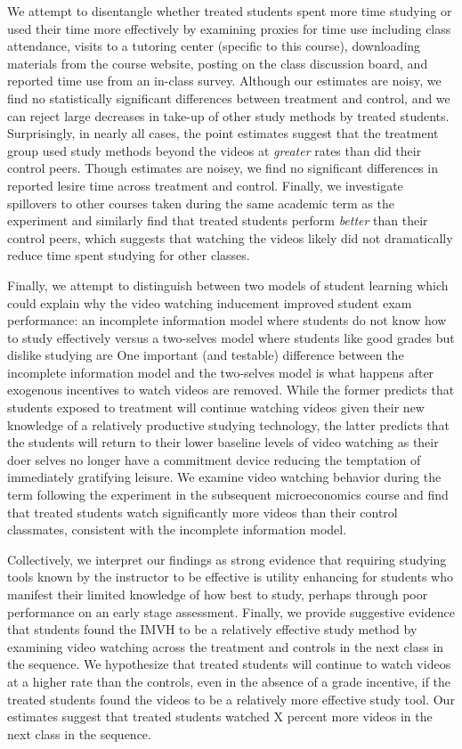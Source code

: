 \documentclass[12pt]{article}
\begin{document}
We attempt to disentangle whether treated students spent more time studying or used their time more effectively by examining proxies for time use including class attendance, visits to a tutoring center (specific to this course), downloading materials from the course website, posting on the class discussion board, and reported time use from an in-class survey. Although our estimates are noisy, we find no statistically significant differences between treatment and control, and we can reject large decreases in take-up of other study methods by treated students. Surprisingly, in nearly all cases, the point estimates suggest that the treatment group used study methods beyond the videos at \textit{greater} rates than did their control peers. Though estimates are noisey, we find no significant differences in reported lesire time across treatment and control.  Finally, we investigate spillovers to other courses taken during the same academic term as the experiment and similarly find that treated students perform \textit{better} than their control peers, which suggests that watching the videos likely did not dramatically reduce time spent studying for other classes.  

Finally, we attempt to distinguish between two models of student learning which could explain why the video watching inducement improved student exam performance:  an incomplete information model where students do not know how to study effectively versus a two-selves model where students like good grades but dislike studying are One important (and testable) difference between the incomplete information model and the two-selves model is what happens after exogenous incentives to watch videos are removed. While the former predicts that students exposed to treatment will continue watching videos given their new knowledge of a relatively productive studying technology, the latter predicts that the students will return to their lower baseline levels of video watching as their doer selves no longer have a commitment device reducing the temptation of immediately gratifying leisure. We examine video watching behavior during the term following the experiment in the subsequent microeconomics course and find that treated students watch significantly more videos than their control classmates, consistent with the incomplete information model. 

Collectively, we interpret our findings as strong evidence that requiring studying tools known by the instructor to be effective is utility enhancing for students who manifest their limited knowledge of how best to study, perhaps through poor performance on an early stage assessment.  Finally, we provide suggestive evidence that students found the IMVH to be a relatively effective study method by examining video watching across the treatment and controls in the next class in the sequence.  We hypothesize that treated students will continue to watch videos at a higher rate than the controls, even in the absence of a grade incentive, if the treated students found the videos to be a relatively more effective study tool.  Our estimates suggest that treated students watched X percent more videos in the next class in the sequence.
\end{document}
